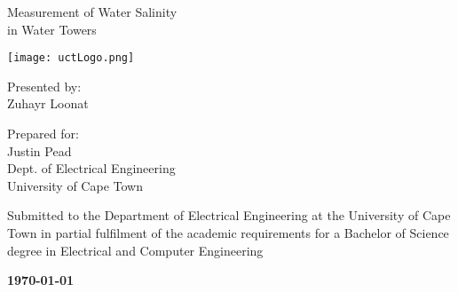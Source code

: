 \documentclass[a4paper,12pt]{report}
\begin{document}
\thispagestyle{empty}
    {\Huge \begin{center}
        Measurement of Water Salinity \\in Water Towers
    \end{center}}

    \vskip 5mm
    \begin{center}
        \texttt{[image: uctLogo.png]}
    \end{center}

    \vskip 5mm
    \begin{center}
        Presented by:\\
        Zuhayr Loonat		%
    \end{center}

    \vskip 10mm
    \begin{center}
        Prepared for:\\
        Justin Pead\\ 		%
        Dept. of Electrical Engineering\\University of Cape Town
    \end{center}


    \vskip 10mm
    \begin{center}
        Submitted to the Department of Electrical Engineering at the University of Cape Town in partial
        fulfilment of the academic requirements for a Bachelor of Science degree in Electrical and Computer Engineering
    \end{center}


    \vskip 5mm
    \begin{center}
        {\bf \today}
    \end{center}

\end{document}
